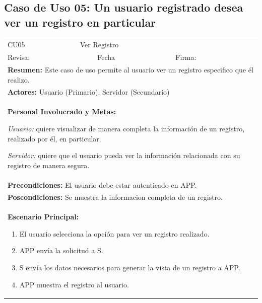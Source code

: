 		\subsection{Caso de Uso 05: Un usuario registrado desea ver un registro en particular}
			\begin{longtable}{|l|p{5.5cm}|l|p{2cm}|l|p{1.9cm}|} \hline
				\cellcolor{grisOscuro} CU05 & \multicolumn{4}{|l|}{  \cellcolor{grisOscuro} Ver Registro} &  \cellcolor{grisClaro}\multirow{2}{1cm}{} \\ \cline{1-5}
				\cellcolor{grisOscuro} Revisa: &  \cellcolor{grisClaro} &  \cellcolor{grisOscuro} Fecha &  \cellcolor{grisClaro} &  \cellcolor{grisOscuro} Firma: & \cellcolor{grisClaro} \\ \hline
				\multicolumn{6}{|p{15cm}|}{ \textbf{Resumen: } Este caso de uso permite al usuario ver un registro especifico que él realizo.

				} \\ \hline

				\multicolumn{6}{|p{15cm}|}{ \textbf{Actores: } Usuario (Primario). Servidor (Secundario)

				} \\ \hline

				\multicolumn{6}{|p{15cm}|}{ \textbf{Personal Involucrado y Metas: }
				
				\emph{Usuario:} quiere visualizar de manera completa la información de un registro, realizado por él, en particular.

				\emph{Servidor:} quiere que el usuario pueda ver la información relacionada con su registro de manera segura.

				} \\ \hline

				\multicolumn{6}{|p{15cm}|}{ \textbf{Precondiciones: } El usuario debe estar autenticado en APP.

				} \\ \hline

				\multicolumn{6}{|p{15cm}|}{ \textbf{Poscondiciones: } Se muestra la informacion completa de un registro.

				} \\ \hline

				\multicolumn{6}{|p{15cm}|}{ \textbf{Escenario Principal: }

				\begin{enumerate}
					\item El usuario selecciona la opción para ver un registro realizado.
					\item APP envía la solicitud a S.
					\item S envía los datos necesarios para generar la vista de un registro a APP.
					\item APP muestra el registro al usuario.
				\end{enumerate}

}
\end{longtable}
